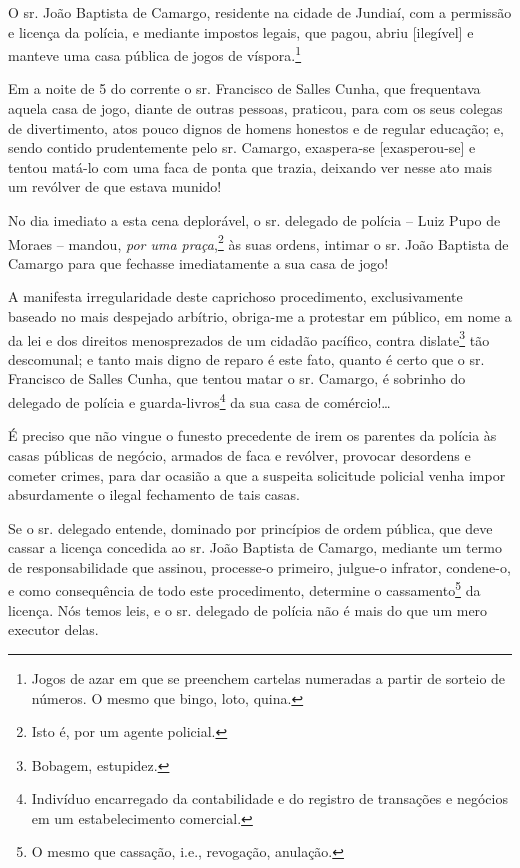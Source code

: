 {\begin{flushright}
O sr. João Baptista de Camargo, residente na cidade de Jundiaí, com a
permissão e licença da polícia, e mediante impostos legais, que pagou,
abriu {[}ilegível{]} e manteve uma casa pública de jogos de
víspora.\footnote{ Jogos de azar em que se preenchem cartelas numeradas
  a partir de sorteio de números. O mesmo que bingo, loto, quina.}

Em a noite de 5 do corrente o sr. Francisco de Salles Cunha, que
frequentava aquela casa de jogo, diante de outras pessoas, praticou,
para com os seus colegas de divertimento, atos pouco dignos de homens
honestos e de regular educação; e, sendo contido prudentemente pelo sr.
Camargo, exaspera-se {[}exasperou-se{]} e tentou matá-lo com uma faca de
ponta que trazia, deixando ver nesse ato mais um revólver de que estava
munido!

No dia imediato a esta cena deplorável, o sr. delegado de polícia --
Luiz Pupo de Moraes -- mandou, \emph{por uma praça},\footnote{ Isto é,
  por um agente policial.} às suas ordens, intimar o sr. João Baptista
de Camargo para que fechasse imediatamente a sua casa de jogo!

A manifesta irregularidade deste caprichoso procedimento, exclusivamente
baseado no mais despejado arbítrio, obriga-me a protestar em público, em
nome a da lei e dos direitos menosprezados de um cidadão pacífico,
contra dislate\footnote{ Bobagem, estupidez.} tão descomunal; e tanto
mais digno de reparo é este fato, quanto é certo que o sr. Francisco de
Salles Cunha, que tentou matar o sr. Camargo, é sobrinho do delegado de
polícia e guarda-livros\footnote{ Indivíduo encarregado da
  contabilidade e do registro de transações e negócios em um
  estabelecimento comercial.} da sua casa de comércio!\ldots{}

É preciso que não vingue o funesto precedente de irem os parentes da
polícia às casas públicas de negócio, armados de faca e revólver,
provocar desordens e cometer crimes, para dar ocasião a que a suspeita
solicitude policial venha impor absurdamente o ilegal fechamento de tais
casas.

Se o sr. delegado entende, dominado por princípios de ordem pública, que
deve cassar a licença concedida ao sr. João Baptista de Camargo,
mediante um termo de responsabilidade que assinou, processe-o primeiro,
julgue-o infrator, condene-o, e como consequência de todo este
procedimento, determine o cassamento\footnote{ O mesmo que cassação,
  i.e., revogação, anulação.} da licença. Nós temos leis, e o sr.
delegado de polícia não é mais do que um mero executor delas.


\end{flushright}}

